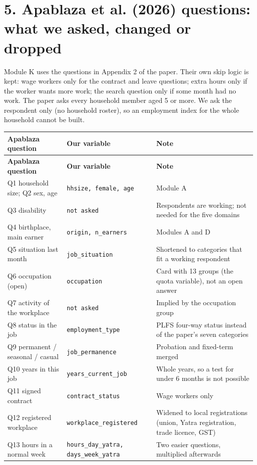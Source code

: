 \documentclass[10pt]{article}
\begin{document}
\section*{5. Apablaza et al. (2026) questions: what we asked, changed or dropped}
Module K uses the questions in Appendix 2 of the paper. Their own skip logic is kept: wage workers only for the contract and leave questions; extra hours only if the worker wants more work; the search question only if some month had no work.
The paper asks every household member aged 5 or more. We ask the respondent only (no household roster), so an employment index for the whole household cannot be built.
{\scriptsize
\begin{longtable}{p{5cm}p{4.6cm}p{6.7cm}}
\toprule
\textbf{Apablaza question} & \textbf{Our variable} & \textbf{Note} \\
\midrule
\endfirsthead
\toprule
\textbf{Apablaza question} & \textbf{Our variable} & \textbf{Note} \\
\midrule
\endhead
Q1 household size; Q2 sex, age & \texttt{hhsize, female, age} & Module A \\
Q3 disability & \texttt{not asked} & Respondents are working; not needed for the five domains \\
Q4 birthplace, main earner & \texttt{origin, n\_earners} & Modules A and D \\
Q5 situation last month & \texttt{job\_situation} & Shortened to categories that fit a working respondent \\
Q6 occupation (open) & \texttt{occupation} & Card with 13 groups (the quota variable), not an open answer \\
Q7 activity of the workplace & \texttt{not asked} & Implied by the occupation group \\
Q8 status in the job & \texttt{employment\_type} & PLFS four-way status instead of the paper's seven categories \\
Q9 permanent / seasonal / casual & \texttt{job\_permanence} & Probation and fixed-term merged \\
Q10 years in this job & \texttt{years\_current\_job} & Whole years, so a test for under 6 months is not possible \\
Q11 signed contract & \texttt{contract\_status} & Wage workers only \\
Q12 registered workplace & \texttt{workplace\_registered} & Widened to local registrations (union, Yatra registration, trade licence, GST) \\
Q13 hours in a normal week & \texttt{hours\_day\_yatra, days\_week\_yatra} & Two easier questions, multiplied afterwards \\

\end{longtable}}
\end{document}
